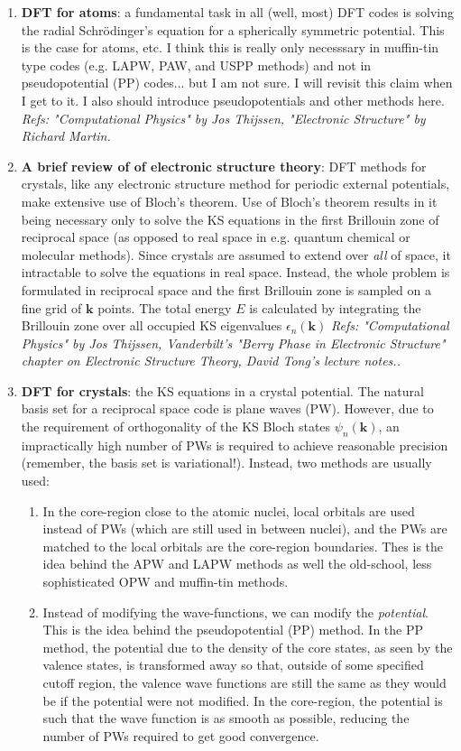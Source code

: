 \documentclass[prb,aps,11pt,superscriptaddress,floatfix]{revtex4-2}
\begin{document}
\begin{enumerate}
  \item \textbf{DFT for atoms}: a fundamental task in all (well, most) DFT codes is solving the radial Schr\"odinger's equation for a spherically symmetric potential. This is the case for atoms, etc. I think this is really only necesssary in muffin-tin type codes (e.g. LAPW, PAW, and USPP methods) and not in pseudopotential (PP) codes... but I am not sure. I will revisit this claim when I get to it. I also should introduce pseudopotentials and other methods here. \emph{Refs: "Computational Physics" by Jos Thijssen, "Electronic Structure" by Richard Martin.}
  \item \textbf{A brief review of of electronic structure theory}: DFT methods for crystals, like any electronic structure method for periodic external potentials, make extensive use of Bloch's theorem. Use of Bloch's theorem results in it being necessary only to solve the KS equations in the first Brillouin zone of reciprocal space (as opposed to real space in e.g. quantum chemical or molecular methods). Since crystals are assumed to extend over \emph{all} of space, it intractable to solve the equations in real space. Instead, the whole problem is formulated in reciprocal space and the first Brillouin zone is sampled on a fine grid of $\pmb{k}$ points. The total energy $E$ is calculated by integrating the Brillouin zone over all occupied KS eigenvalues $\epsilon_{n}(\pmb{k})$ \emph{Refs: "Computational Physics" by Jos Thijssen, Vanderbilt's "Berry Phase in Electronic Structure" chapter on Electronic Structure Theory, David Tong's lecture notes..}
  \item \textbf{DFT for crystals}: the KS equations in a crystal potential. The natural basis set for a reciprocal space code is plane waves (PW). However, due to the requirement of orthogonality of the KS Bloch states $\psi_n(\pmb{k})$, an impractically high number of PWs is required to achieve reasonable precision (remember, the basis set is variational!). Instead, two methods are usually used: 
    \begin{enumerate}
      \item In the core-region close to the atomic nuclei, local orbitals are used instead of PWs (which are still used in between nuclei), and the PWs are matched to the local orbitals are the core-region boundaries. Thes is the idea behind the APW and LAPW methods as well the old-school, less sophisticated OPW and muffin-tin methods. 
      \item Instead of modifying the wave-functions, we can modify the \emph{potential}. This is the idea behind the pseudopotential (PP) method. In the PP method, the potential due to the density of the core states, as seen by the valence states, is transformed away so that, outside of some specified cutoff region, the valence wave functions are still the same as they would be if the potential were not modified. In the core-region, the potential is such that the wave function is as smooth as possible, reducing the number of PWs required to get good convergence. 

\end{enumerate}
\end{enumerate}
\end{document}
